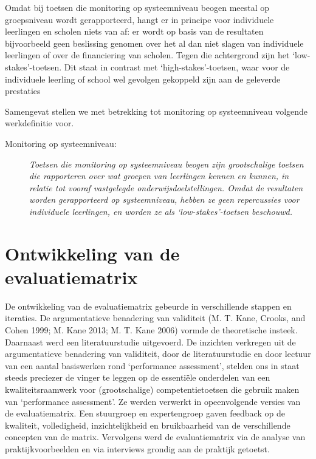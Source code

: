 \documentclass[
  letterpaper,
]{report}
\begin{document}
Omdat bij toetsen die monitoring op systeemniveau beogen meestal op
groepsniveau wordt gerapporteerd, hangt er in principe voor individuele
leerlingen en scholen niets van af: er wordt op basis van de resultaten
bijvoorbeeld geen beslissing genomen over het al dan niet slagen van
individuele leerlingen of over de financiering van scholen. Tegen die
achtergrond zijn het `low-stakes'-toetsen. Dit staat in contrast met
`high-stakes'-toetsen, waar voor de individuele leerling of school wel
gevolgen gekoppeld zijn aan de geleverde prestaties

Samengevat stellen we met betrekking tot monitoring op systeemniveau
volgende werkdefinitie voor.

\begin{description}
\item[Monitoring op systeemniveau:]
\emph{Toetsen die monitoring op systeemniveau beogen zijn grootschalige
toetsen die rapporteren over wat groepen van leerlingen kennen en
kunnen, in relatie tot vooraf vastgelegde onderwijsdoelstellingen. Omdat
de resultaten worden gerapporteerd op systeemniveau, hebben ze geen
repercussies voor individuele leerlingen, en worden ze als
`low-stakes'-toetsen beschouwd.}
\end{description}

\hypertarget{ontwikkeling-van-de-evaluatiematrix}{%
\chapter{Ontwikkeling van de
evaluatiematrix}\label{ontwikkeling-van-de-evaluatiematrix}}

De ontwikkeling van de evaluatiematrix gebeurde in verschillende stappen
en iteraties. De argumentatieve benadering van validiteit (M. T. Kane,
Crooks, and Cohen 1999; M. Kane 2013; M. T. Kane 2006) vormde de
theoretische insteek. Daarnaast werd een literatuurstudie uitgevoerd. De
inzichten verkregen uit de argumentatieve benadering van validiteit,
door de literatuurstudie en door lectuur van een aantal basiswerken rond
`performance assessment', stelden ons in staat steeds preciezer de
vinger te leggen op de essentiële onderdelen van een kwaliteitsraamwerk
voor (grootschalige) competentietoetsen die gebruik maken van
`performance assessment'. Ze werden verwerkt in opeenvolgende versies
van de evaluatiematrix. Een stuurgroep en expertengroep gaven feedback
op de kwaliteit, volledigheid, inzichtelijkheid en bruikbaarheid van de
verschillende concepten van de matrix. Vervolgens werd de
evaluatiematrix via de analyse van praktijkvoorbeelden en via interviews
grondig aan de praktijk getoetst.
\end{document}
